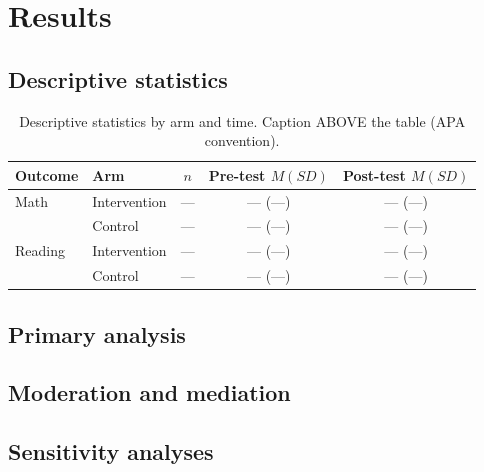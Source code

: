 \documentclass[11pt,a4paper]{article}
\begin{document}
\section{Results}
\label{sec:results}

\subsection{Descriptive statistics}

\begin{table}[t]
\caption{Descriptive statistics by arm and time. Caption ABOVE the table (APA convention).}
\label{tab:descriptives}
\centering
\begin{tabular}{llccc}
\toprule
Outcome & Arm & $n$ & Pre-test $M (SD)$ & Post-test $M (SD)$ \\
\midrule
Math    & Intervention & --- & --- (---) & --- (---) \\
        & Control      & --- & --- (---) & --- (---) \\
Reading & Intervention & --- & --- (---) & --- (---) \\
        & Control      & --- & --- (---) & --- (---) \\
\bottomrule
\end{tabular}
\end{table}

\subsection{Primary analysis}

\subsection{Moderation and mediation}

\subsection{Sensitivity analyses}
\end{document}
